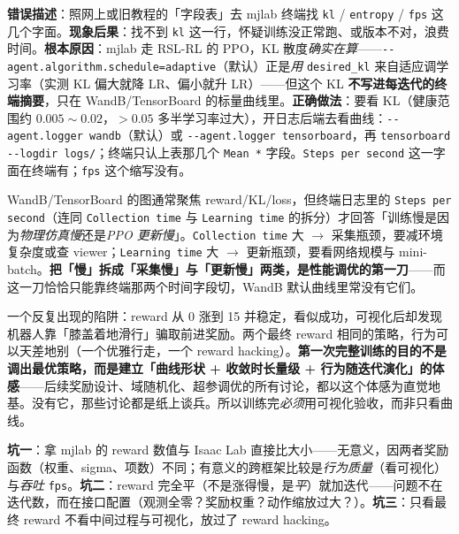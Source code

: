 \begin{pitfall}
\textbf{错误描述}：照网上或旧教程的「字段表」去 mjlab 终端找 \verb|kl| / \verb|entropy| / \verb|fps| 这几个字面。\textbf{现象后果}：找不到 \verb|kl| 这一行，怀疑训练没正常跑、或版本不对，浪费时间。\textbf{根本原因}：mjlab 走 RSL-RL 的 PPO，KL 散度\emph{确实在算}——\verb|--agent.algorithm.schedule=adaptive|（默认）正是\emph{用} \verb|desired_kl| 来自适应调学习率（实测 KL 偏大就降 LR、偏小就升 LR）——但这个 KL \textbf{不写进每迭代的终端摘要}，只在 WandB/TensorBoard 的标量曲线里。\textbf{正确做法}：要看 KL（健康范围约 $0.005\sim0.02$，$>0.05$ 多半学习率过大），开日志后端去看曲线：\verb|--agent.logger wandb|（默认）或 \verb|--agent.logger tensorboard|，再 \verb|tensorboard --logdir logs/|；终端只认上表那几个 \verb|Mean *| 字段。\verb|Steps per second| 这一字面在终端有；\verb|fps| 这个缩写没有。
\end{pitfall}

\begin{insight}\label{ins:rlmc-read-log}
WandB/TensorBoard 的图通常聚焦 reward/KL/loss，但终端日志里的 \verb|Steps per second|（连同 \verb|Collection time| 与 \verb|Learning time| 的拆分）才回答「训练慢是因为\emph{物理仿真慢}还是\emph{PPO 更新慢}」。\verb|Collection time| 大 $\to$ 采集瓶颈，要减环境复杂度或查 viewer；\verb|Learning time| 大 $\to$ 更新瓶颈，要看网络规模与 mini-batch。\textbf{把「慢」拆成「采集慢」与「更新慢」两类，是性能调优的第一刀}——而这一刀恰恰只能靠终端那两个时间字段切，WandB 默认曲线里常没有它们。
\end{insight}

\begin{insight}\label{ins:rlmc-reward-not-behavior}
一个反复出现的陷阱：reward 从 0 涨到 15 并稳定，看似成功，可视化后却发现机器人靠「膝盖着地滑行」骗取前进奖励。两个最终 reward 相同的策略，行为可以天差地别（一个优雅行走，一个 reward hacking）。\textbf{第一次完整训练的目的不是调出最优策略，而是建立「曲线形状 + 收敛时长量级 + 行为随迭代演化」的体感}——后续奖励设计、域随机化、超参调优的所有讨论，都以这个体感为直觉地基。没有它，那些讨论都是纸上谈兵。所以训练完\emph{必须}用可视化验收，而非只看曲线。
\end{insight}

\begin{pitfall}
\textbf{坑一}：拿 mjlab 的 reward 数值与 Isaac Lab 直接比大小——无意义，因两者奖励函数（权重、sigma、项数）不同；有意义的跨框架比较是\emph{行为质量}（看可视化）与\emph{吞吐} \verb|fps|。\textbf{坑二}：reward 完全平（不是涨得慢，是\emph{平}）就加迭代——问题不在迭代数，而在接口配置（观测全零？奖励权重？动作缩放过大？）。\textbf{坑三}：只看最终 reward 不看中间过程与可视化，放过了 reward hacking。
\end{pitfall}

